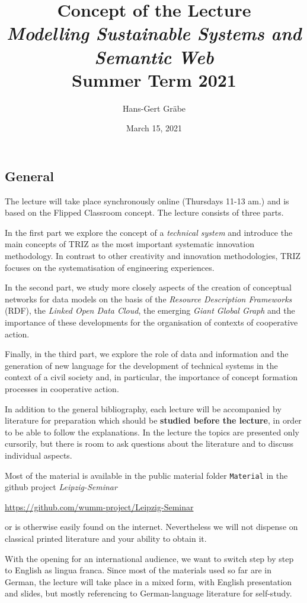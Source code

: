 \documentclass[11pt,a4paper]{article}
\title{Concept of the Lecture \\[1em] \emph{Modelling Sustainable Systems and
    Semantic Web} \\[1em] Summer Term 2021}
\author{Hans-Gert Gr\"abe}
\date{March 15, 2021}
\begin{document}
\maketitle

\subsection{General}

The lecture will take place synchronously online (Thursdays 11-13 am.) and is
based on the Flipped Classroom concept. The lecture consists of three parts.

In the first part we explore the concept of a \emph{technical system} and
introduce the main concepts of TRIZ as the most important systematic
innovation methodology.  In contrast to other creativity and innovation
methodologies, TRIZ focuses on the systematisation of engineering experiences.

In the second part, we study more closely aspects of the creation of
conceptual networks for data models on the basis of the \emph{Resource
  Description Frameworks} (RDF), the \emph{Linked Open Data Cloud}, the
emerging \emph{Giant Global Graph} and the importance of these developments
for the organisation of contexts of cooperative action.

Finally, in the third part, we explore the role of data and information and
the generation of new language for the development of technical systems in the
context of a civil society and, in particular, the importance of concept
formation processes in cooperative action.

In addition to the general bibliography, each lecture will be accompanied by
literature for preparation which should be \textbf{studied before the
  lecture}, in order to be able to follow the explanations. In the lecture the
topics are presented only cursorily, but there is room to ask questions about
the literature and to discuss individual aspects.

Most of the material is available in the public material folder
\texttt{Material} in the github project \emph{Leipzig-Seminar}
\begin{center}
  \url{https://github.com/wumm-project/Leipzig-Seminar}
\end{center}
or is otherwise easily found on the internet. Nevertheless we will not
dispense on classical printed literature and your ability to obtain it.

With the opening for an international audience, we want to switch step by step
to English as lingua franca. Since most of the materials used so far are in
German, the lecture will take place in a mixed form, with English presentation
and slides, but mostly referencing to German-language literature for
self-study.
\end{document}
